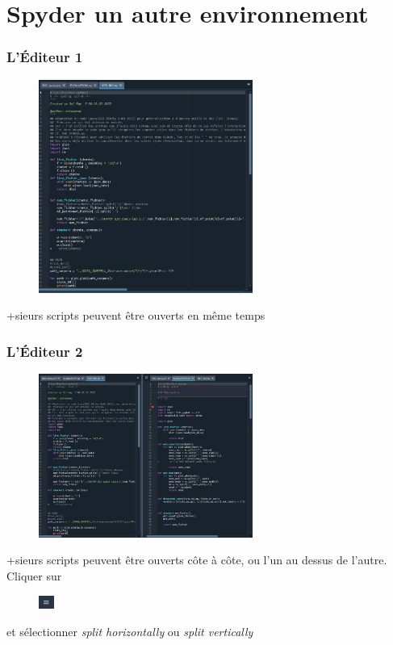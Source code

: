 \section{Spyder un autre environnement }  

\begin{frame} \frametitle{L'Éditeur 1}
  \begin{figure}
  \includegraphics[width=7cm]{images/spyder_editor.png}
  \end{figure}
  
   +sieurs scripts peuvent être ouverts en même temps
\end{frame}

\begin{frame} \frametitle{L'Éditeur 2}

  \begin{figure}
  \includegraphics[width=7cm]{images/spyder_editor2.png}
  \end{figure}
  
   +sieurs scripts peuvent être ouverts côte à côte, ou l'un au dessus de l'autre.\\
   Cliquer sur
  \vspace{-0.3cm} 
  \begin{figure}
  \includegraphics[width=0.5cm]{images/spyder_param.png}
  \end{figure} 
  \vspace{-0.3cm}
  et sélectionner \textit{split horizontally} ou \textit{split vertically}
\end{frame}


